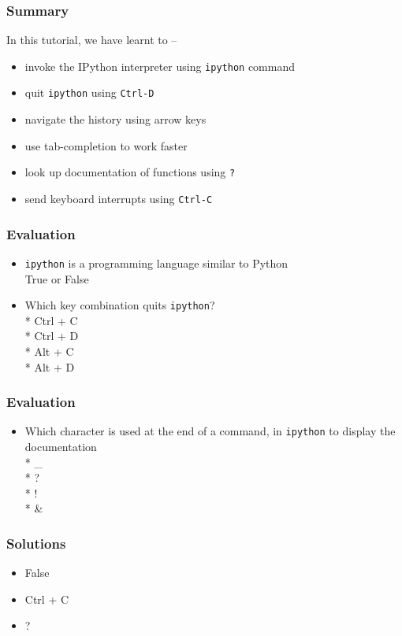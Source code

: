 \documentclass[presentation]{beamer}
\begin{document}
\begin{frame}
\frametitle{Summary}
\label{sec-10}
In this tutorial, we have learnt to --
\begin{itemize}
\item invoke the IPython interpreter using \texttt{ipython} command 
\item quit \texttt{ipython} using \texttt{Ctrl-D}
\item navigate the history using arrow keys
\item use tab-completion to work faster
\item look up documentation of functions using \texttt{?}
\item send keyboard interrupts using \texttt{Ctrl-C}
\end{itemize}
\end{frame}
\begin{frame}
\frametitle{Evaluation}
\label{sec-11}

\begin{itemize}
\item \texttt{ipython} is a programming language similar to Python  \\
 True or False\\ 
 \vspace*{20pt}
 \item   Which key combination quits \texttt{ipython}?\\
 \vspace*{10pt}
  * Ctrl + C\\
  * Ctrl + D\\
  * Alt + C\\
  * Alt + D\\
\end{itemize} 
\end{frame}
\begin{frame}
\frametitle{Evaluation}
\label{sec-12}

\begin{itemize}
\item Which character is used at the end of a command, in \texttt{ipython} to display the documentation\\ 
\vspace*{10pt}
 * \_\\
 * ?\\
 * !\\
 * \&\\ 
\end{itemize}
\end{frame}
\begin{frame}
\frametitle{Solutions}
\label{sec-13}

\begin{itemize}
\item False
\vspace*{10pt}
\item Ctrl + C
\vspace*{10pt}
\item ?
\end{itemize}
\end{frame}
\end{document}
